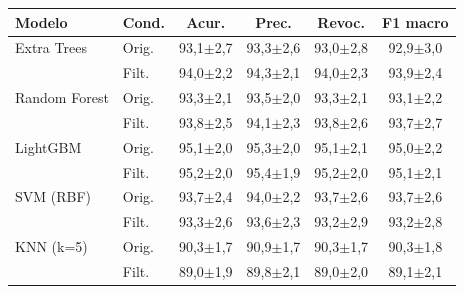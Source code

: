 \begin{tabular}{@{}llcccc@{}}
\toprule
Modelo & Cond. & Acur. & Prec. & Revoc. & F1 macro\\
\midrule
Extra Trees & Orig. & 93,1$\pm$2,7 & 93,3$\pm$2,6 & 93,0$\pm$2,8 & 92,9$\pm$3,0\\
 & Filt. & 94,0$\pm$2,2 & 94,3$\pm$2,1 & 94,0$\pm$2,3 & 93,9$\pm$2,4\\
\addlinespace[2pt]
Random Forest & Orig. & 93,3$\pm$2,1 & 93,5$\pm$2,0 & 93,3$\pm$2,1 & 93,1$\pm$2,2\\
 & Filt. & 93,8$\pm$2,5 & 94,1$\pm$2,3 & 93,8$\pm$2,6 & 93,7$\pm$2,7\\
\addlinespace[2pt]
LightGBM & Orig. & 95,1$\pm$2,0 & 95,3$\pm$2,0 & 95,1$\pm$2,1 & 95,0$\pm$2,2\\
 & Filt. & 95,2$\pm$2,0 & 95,4$\pm$1,9 & 95,2$\pm$2,0 & 95,1$\pm$2,1\\
\addlinespace[2pt]
SVM (RBF) & Orig. & 93,7$\pm$2,4 & 94,0$\pm$2,2 & 93,7$\pm$2,6 & 93,7$\pm$2,6\\
 & Filt. & 93,3$\pm$2,6 & 93,6$\pm$2,3 & 93,2$\pm$2,9 & 93,2$\pm$2,8\\
\addlinespace[2pt]
KNN (k=5) & Orig. & 90,3$\pm$1,7 & 90,9$\pm$1,7 & 90,3$\pm$1,7 & 90,3$\pm$1,8\\
 & Filt. & 89,0$\pm$1,9 & 89,8$\pm$2,1 & 89,0$\pm$2,0 & 89,1$\pm$2,1\\
\bottomrule
\end{tabular}
